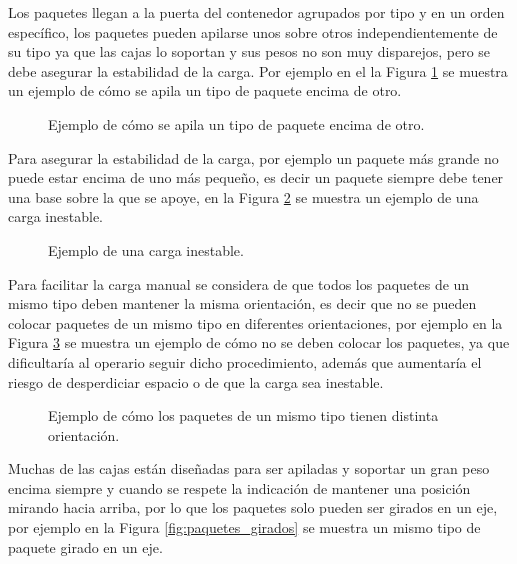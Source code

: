 Los paquetes llegan a la puerta del contenedor agrupados por tipo y en un orden específico, los paquetes pueden apilarse unos sobre otros independientemente de su tipo ya que las cajas lo soportan y sus pesos no son muy disparejos, pero se debe asegurar la estabilidad de la carga. Por ejemplo en el la Figura \ref{fig:paquetes_apilados} se muestra un ejemplo de cómo se apila un tipo de paquete encima de otro.

\begin{figure}[H]
    \centering
    
    \caption{Ejemplo de cómo se apila un tipo de paquete encima de otro.}
    \label{fig:paquetes_apilados}
\end{figure}

Para asegurar la estabilidad de la carga, por ejemplo un paquete más grande no puede estar encima de uno más pequeño, es decir un paquete siempre debe tener una base sobre la que se apoye, en la Figura \ref{fig:paquetes_mal_apilados} se muestra un ejemplo de una carga inestable.

\begin{figure}[H]
    \centering
    
    \caption{Ejemplo de una carga inestable.}
    \label{fig:paquetes_mal_apilados}
\end{figure}

Para facilitar la carga manual se considera de que todos los paquetes de un mismo tipo deben mantener la misma orientación, es decir que no se pueden colocar paquetes de un mismo tipo en diferentes orientaciones, por ejemplo en la Figura \ref{fig:paquetes_mal_orientados} se muestra un ejemplo de cómo no se deben colocar los paquetes, ya que dificultaría al operario seguir dicho procedimiento, además que aumentaría el riesgo de desperdiciar espacio o de que la carga sea inestable.

\begin{figure}[H]
    \centering
    
    \caption{Ejemplo de cómo los paquetes de un mismo tipo tienen distinta orientación.}
    \label{fig:paquetes_mal_orientados}
\end{figure}

Muchas de las cajas están diseñadas para ser apiladas y soportar un gran peso encima siempre y cuando se respete la indicación de mantener una posición mirando hacia arriba, por lo que los paquetes solo pueden ser girados en un eje, por ejemplo en la Figura \ref{fig:paquetes_girados} se muestra un mismo tipo de paquete girado en un eje.

